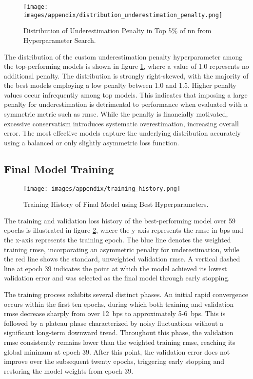\begin{figure}[H]
	\centering
	\texttt{[image: images/appendix/distribution\_underestimation\_penalty.png]}
	\caption{Distribution of Underestimation Penalty in Top 5\% of \ac{nn} from Hyperparameter Search.}
	\label{fig:distribution_underestimation_penalty}
\end{figure}
The distribution of the custom underestimation penalty hyperparameter among the top-performing models is shown in figure \ref{fig:distribution_underestimation_penalty}, where a value of 1.0 represents no additional penalty. The distribution is strongly right-skewed, with the majority of the best models employing a low penalty between 1.0 and 1.5. Higher penalty values occur infrequently among top models. This indicates that imposing a large penalty for underestimation is detrimental to performance when evaluated with a symmetric metric such as \ac{rmse}. While the penalty is financially motivated, excessive conservatism introduces systematic overestimation, increasing overall error. The most effective models capture the underlying distribution accurately using a balanced or only slightly asymmetric loss function.

\subsection{Final Model Training}
\begin{figure}[H]
	\centering
	\texttt{[image: images/appendix/training\_history.png]}
	\caption{Training History of Final Model using Best Hyperparameters.}
	\label{fig:training_history}
\end{figure}
The training and validation loss history of the best-performing model over 59 epochs is illustrated in figure \ref{fig:training_history}, where the y-axis represents the \ac{rmse} in \ac{bps} and the x-axis represents the training epoch. The blue line denotes the weighted training \ac{rmse}, incorporating an asymmetric penalty for underestimation, while the red line shows the standard, unweighted validation \ac{rmse}. A vertical dashed line at epoch 39 indicates the point at which the model achieved its lowest validation error and was selected as the final model through early stopping.

The training process exhibits several distinct phases. An initial rapid convergence occurs within the first ten epochs, during which both training and validation \ac{rmse} decrease sharply from over 12~\ac{bps} to approximately 5-6~\ac{bps}. This is followed by a plateau phase characterized by noisy fluctuations without a significant long-term downward trend. Throughout this phase, the validation \ac{rmse} consistently remains lower than the weighted training \ac{rmse}, reaching its global minimum at epoch 39. After this point, the validation error does not improve over the subsequent twenty epochs, triggering early stopping and restoring the model weights from epoch 39.

